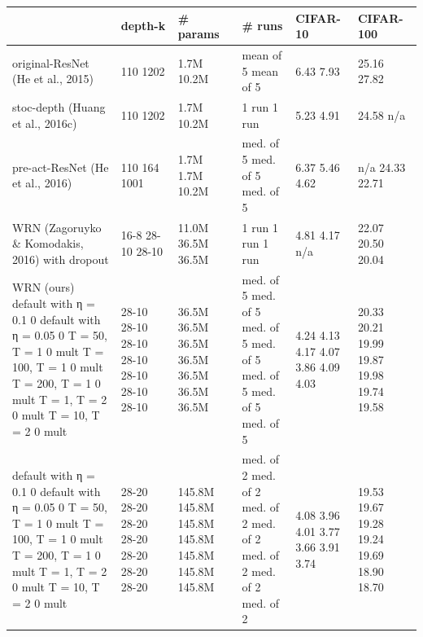 \begin{tabular}{llllll}
\toprule
 & depth-k & \# params & \# runs & CIFAR-10 & CIFAR-100 \\
\midrule
original-ResNet (He et al., 2015) & 110 1202 & 1.7M 10.2M & mean of 5 mean of 5 & 6.43 7.93 & 25.16 27.82 \\
stoc-depth (Huang et al., 2016c) & 110 1202 & 1.7M 10.2M & 1 run 1 run & 5.23 4.91 & 24.58 n/a \\
pre-act-ResNet (He et al., 2016) & 110 164 1001 & 1.7M 1.7M 10.2M & med. of 5 med. of 5 med. of 5 & 6.37 5.46 4.62 & n/a 24.33 22.71 \\
WRN (Zagoruyko \& Komodakis, 2016) with dropout & 16-8 28-10 28-10 & 11.0M 36.5M 36.5M & 1 run 1 run 1 run & 4.81 4.17 n/a & 22.07 20.50 20.04 \\
WRN (ours) default with η = 0.1 0 default with η = 0.05 0 T = 50, T = 1 0 mult T = 100, T = 1 0 mult T = 200, T = 1 0 mult T = 1, T = 2 0 mult T = 10, T = 2 0 mult & 28-10 28-10 28-10 28-10 28-10 28-10 28-10 & 36.5M 36.5M 36.5M 36.5M 36.5M 36.5M 36.5M & med. of 5 med. of 5 med. of 5 med. of 5 med. of 5 med. of 5 med. of 5 & 4.24 4.13 4.17 4.07 3.86 4.09 4.03 & 20.33 20.21 19.99 19.87 19.98 19.74 19.58 \\
default with η = 0.1 0 default with η = 0.05 0 T = 50, T = 1 0 mult T = 100, T = 1 0 mult T = 200, T = 1 0 mult T = 1, T = 2 0 mult T = 10, T = 2 0 mult & 28-20 28-20 28-20 28-20 28-20 28-20 28-20 & 145.8M 145.8M 145.8M 145.8M 145.8M 145.8M 145.8M & med. of 2 med. of 2 med. of 2 med. of 2 med. of 2 med. of 2 med. of 2 & 4.08 3.96 4.01 3.77 3.66 3.91 3.74 & 19.53 19.67 19.28 19.24 19.69 18.90 18.70 \\
\bottomrule
\end{tabular}
